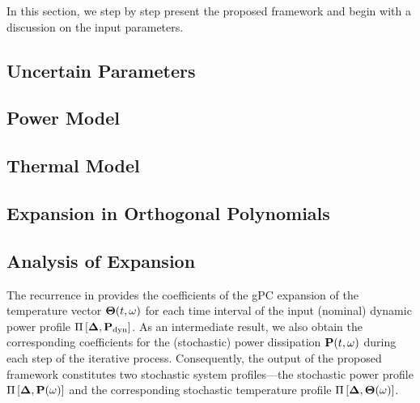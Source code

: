In this section, we step by step present the proposed framework and begin with a discussion on the input parameters.

\subsection{Uncertain Parameters} 


\subsection{Power Model} 


\subsection{Thermal Model} 


\subsection{Expansion in Orthogonal Polynomials}


\subsection{Analysis of Expansion}
The recurrence in  provides the coefficients of the gPC expansion of the temperature vector ${\boldsymbol\Theta}(t, \omega)$ for each time interval of the input (nominal) dynamic power profile $\prof{\mP_\dyn}$. As an intermediate result, we also obtain the corresponding coefficients for the (stochastic) power dissipation $\mathbf{P}(t, \omega)$ during each step of the iterative process. Consequently, the output of the proposed framework constitutes two stochastic system profiles---the stochastic power profile $\prof{\mP(\o)}$ and the corresponding stochastic temperature profile $\Pi\left[\boldsymbol{\Delta}, {\boldsymbol\Theta}(\omega)\right]$.

